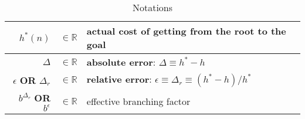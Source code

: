 \begin{customArrayStretch}{1.3}
\begin{table}[H]
\begin{tabular}{r c p{12cm}}
$h^\ast(n)$ & $\in \mathbb{R}$ & actual cost of getting from the root to the goal \\

\hline

$\Delta$ & $\in \mathbb{R}$ & \textbf{absolute error}: $\Delta \equiv h^\ast - h$  \\

$\epsilon$ \textbf{OR} $\Delta_r$ & 
$\in \mathbb{R}$ & 
\textbf{relative error}: $\epsilon \equiv \Delta_r \equiv (h^\ast - h)/h^\ast$ \\


$b^{\Delta_r}$ \textbf{OR} $b^\epsilon$ &
$\in \mathbb{R}$ & 
effective branching factor \\




\end{tabular}
\caption*{Notations}
\end{table}
\end{customArrayStretch}


